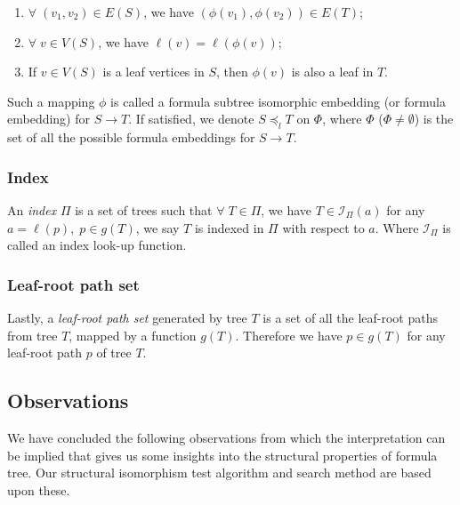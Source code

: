 \begin{enumerate}
\item 
$\forall\; (v_1,v_2) \in E(S)$, we have $(\phi(v_1),\phi(v_2)) \in E(T)$;
\item
$\forall\; v \in V(S)$, we have $\ell(v) = \ell(\phi(v))$;
\item
If $v \in V(S)$ is a leaf vertices in $S$, then $\phi(v)$ is also a leaf in $T$.
\end{enumerate}
Such a mapping $\phi$ is called a formula subtree isomorphic embedding (or formula embedding) for $S \rightarrow T$. 
If satisfied, we denote $S \preceq_l T$ on $\Phi$, where $\Phi$ ($\Phi \neq \emptyset$) is the set of all the possible formula embeddings for $S \rightarrow T$.

\subsubsection{Index}
An \textit{index} $\Pi$ is a set of trees such that $\forall\; T \in \Pi$, we have $T \in \mathcal{I}_{\Pi}(a)$ for any $a = \ell(p), \; p \in g(T)$, we say $T$ is indexed in $\Pi$ with respect to $a$.
Where $\mathcal{I}_{\Pi}$ is called an index look-up function. 

\subsubsection{Leaf-root path set}
Lastly, a \textit{leaf-root path set} generated by tree $T$ is a set of all the leaf-root paths from tree $T$, mapped by a function $g(T)$. Therefore we have $p \in g(T)$ for any leaf-root path $p$ of tree $T$.


\subsection{Observations}
\label{observationlabel}
We have concluded the following observations from which the interpretation can be implied that gives us some insights into the structural properties of formula tree. Our structural isomorphism test algorithm and search method are based upon these. 

